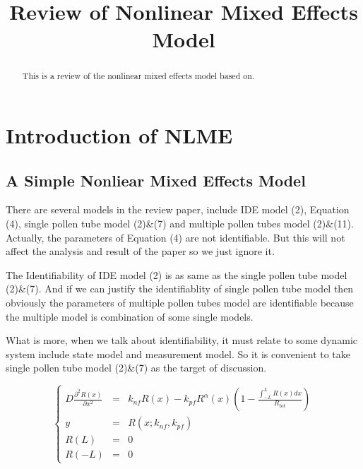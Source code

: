 \documentclass[12pt]{extarticle}
\title{Review of Nonlinear Mixed Effects Model}
\begin{document}
\maketitle
\begin{abstract}
This is a review of the nonlinear mixed effects model based on.
\end{abstract}
\section{Introduction of NLME}
\label{sect:Introduction}

\subsection{A Simple Nonliear Mixed Effects Model}
\label{sect:What}

\sybsection{}

\cite{Putter02}
\cite{Huang0601}
\cite{Huang0602}
\cite{Guedj07}
\cite{Li02}
\cite{Lu11}

There are several models in the review paper, include IDE model (2), Equation (4), single pollen tube model (2)\&(7) and multiple pollen tubes model (2)\&(11). Actually, the parameters of Equation (4) are not identifiable. But this will not affect the analysis and result of the paper so we just ignore it.

The Identifiability of IDE model (2) is as same as the single pollen tube model (2)\&(7). And if we can justify the identifiablity of single pollen tube model then obviously the parameters of multiple pollen tubes model are identifiable because the multiple model is combination of some single models.

What is more, when we talk about identifiability, it must relate to some dynamic system include state model and measurement model. So it is convenient to take single pollen tube model (2)\&(7) as the target of discussion. 

\begin{equation}
\left\{
\begin{array}{rcl}
D\frac{{\partial}^{2}R(x)}{{\partial}x^{2}} & = & k_{nf}R(x)-k_{pf}R^{\alpha}(x)\left(1-\frac{\int_{-L}^{L}R(x)dx}{R_{tot}}\right) \\
y & = & R(x;k_{nf},k_{pf}) \\
R(L) & = & 0 \\
R(-L) & = & 0
\end{array} \right.
\end{equation}
\end{document}
